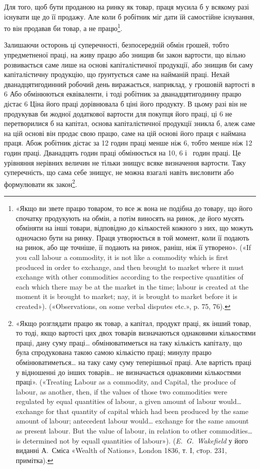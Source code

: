 Для того, щоб бути проданою на ринку як товар, праця мусила
б у всякому разі існувати ще до її продажу. Але коли б
робітник міг дати їй самостійне існування, то він продавав би
товар, а не працю\footnote{
«Якщо ви звете працю товаром, то все ж вона не подібна до товару,
що його спочатку продукують на обмін, а потім виносять на ринок, де
його мусять обміняти на інші товари, відповідно до кількостей кожного
з них, що можуть одночасно бути на ринку. Праця утворюється в той
момент, коли її подають на ринок, або ще точніше, її подають на ринок,
раніш, ніж її утворено». («If you call labour a commodity, it is not like a
commodity which is first produced in order to exchange, and then brought
to market where it must exchange with other commodities according to the
respective quantities of each which there may be at the market in the
time; labour is created at the moment it is brought to market; nay, it is
brought to market before it is created»). («Observations, on some verbal
disputes etc.», p. 75, 76).
}.

Залишаючи осторонь ці суперечності, безпосередній обмін грошей,
тобто упредметненої праці, на живу працю або знищив би
закон вартости, що вільно розвивається саме лише на основі
капіталістичної продукції, або знищив би саму капіталістичну
продукцію, що ґрунтується саме на найманій праці. Нехай дванадцятигодинний
робочий день виражається, наприклад, у грошовій
вартості в 6 Або обмінюються еквіваленти, і тоді
робітник за дванадцятигодинну працю дістає 6 Ціна
його праці дорівнювала б ціні його продукту. В цьому разі він
не продукував би жодної додаткової вартости для покупця його
праці, ці 6 не перетворилися б на капітал, основа капіталістичної
продукції зникла б, алеж саме на цій основі він
продає свою працю, саме на цій основі його праця є наймана
праця. Абож робітник дістає за 12 годин праці менше ніж 6,
тобто менше ніж 12 годин праці. Дванадцять годин праці
обмінюється на 10, 6 і~ годин праці. Це урівняння нерівних
величин не тільки знищує всяке визначення вартости. Таку
суперечність, що сама себе знищує, не можна взагалі навіть висловити
або формулювати як закон\footnote{
«Якщо розглядати працю як товар, а капітал, продукт праці,
як інший товар, то тоді, якщо вартості цих двох товарів визначаються
однаковими кількостями праці, дану суму праці\dots{} обмінюватиметься
на таку кількість капіталу, що була спродукована такою самою кількістю
праці; минулу працю обмінюватиметься\dots{} на таку саму суму теперішньої
праці. Але вартість праці у відношенні до інших товарів\dots{} не визначається
однаковими кількостями праці». («Treating Labour as a commodity,
and Capital, the produce of labour, as another, then, if the values
of those two commodities were regulated by equal quantities of labour,
a given amount of labour would\dots{} exchange for that quantity of capital
which had been produced by the same amount of labour; antecedent labour
would\dots{} exchange for the same amount as present labour. But the value
of labour, in relation to other commodities\dots{} is determined not by equall
quantities of labour»). (\emph{E.~G.~Wakefield} у його виданні А.~Сміса «Wealth
of Nations», London 1836, т. I, cтop. 231, примітка).
}.
